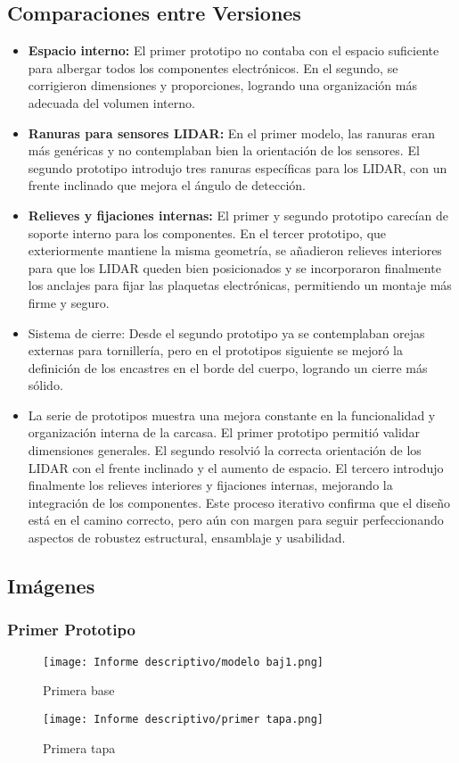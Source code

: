 \documentclass[12pt,a4paper]{article}
\begin{document}
\subsection{Comparaciones entre Versiones}
\begin{itemize}
\item \textbf{Espacio interno:} El primer prototipo no contaba con el espacio suficiente para albergar todos los componentes electrónicos. En el segundo, se corrigieron dimensiones y proporciones, logrando una organización más adecuada del volumen interno.
\item \textbf{Ranuras para sensores LIDAR:} En el primer modelo, las ranuras eran más genéricas y no contemplaban bien la orientación de los sensores. El segundo prototipo introdujo tres ranuras específicas para los LIDAR, con un frente inclinado que mejora el ángulo de detección.
\item \textbf{Relieves y fijaciones internas:} El primer y segundo prototipo carecían de soporte interno para los componentes. En el tercer prototipo, que exteriormente mantiene la misma geometría, se añadieron relieves interiores para que los LIDAR queden bien posicionados y se incorporaron finalmente los anclajes para fijar las plaquetas electrónicas, permitiendo un montaje más firme y seguro.
\item Sistema de cierre: Desde el segundo prototipo ya se contemplaban orejas externas para tornillería, pero en el prototipos siguiente se mejoró la definición de los encastres en el borde del cuerpo, logrando un cierre más sólido.
\item La serie de prototipos muestra una mejora constante en la funcionalidad y organización interna de la carcasa. El primer prototipo permitió validar dimensiones generales. El segundo resolvió la correcta orientación de los LIDAR con el frente inclinado y el aumento de espacio. El tercero introdujo finalmente los relieves interiores y fijaciones internas, mejorando la integración de los componentes. Este proceso iterativo confirma que el diseño está en el camino correcto, pero aún con margen para seguir perfeccionando aspectos de robustez estructural, ensamblaje y usabilidad.
\end{itemize}

\subsection{Imágenes}
\subsubsection{Primer Prototipo}
\begin{figure}[H]
    \centering
    \texttt{[image: Informe descriptivo/modelo baj1.png]}
    \caption{Primera base}
\end{figure}
\begin{figure}[H]
    \centering
    \texttt{[image: Informe descriptivo/primer tapa.png]}
    \caption{Primera tapa}
\end{figure}
\end{document}
